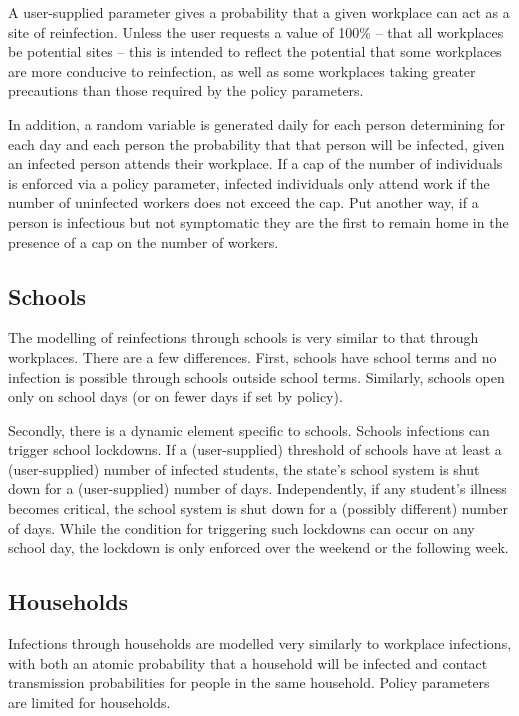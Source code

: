 \documentclass{grattan}
\begin{document}
A user-supplied parameter gives a probability that a given workplace can act as a site
of reinfection. Unless the user requests a value of 100\% -- that all workplaces
be potential sites -- this is intended to reflect the potential that some workplaces are more
conducive to reinfection, as well as some workplaces taking greater precautions than those
required by the policy parameters.

In addition, a random variable is generated daily for each person determining for each day
and each person the probability that that person will be infected, given an infected person
attends their workplace. If a cap of the number of individuals is enforced via a policy
parameter, infected individuals only attend work if the number of uninfected workers does
not exceed the cap. Put another way, if a person is infectious but not symptomatic they are
the first to remain home in the presence of a cap on the number of workers.

\subsection{Schools}

The modelling of reinfections through schools is very similar to that through workplaces.
There are a few differences.
First, schools have school terms and no infection is possible through schools outside school terms.
Similarly, schools open only on school days (or on fewer days if set by policy).

Secondly, there is a dynamic element specific to schools. Schools infections can trigger school
lockdowns. If a (user-supplied) threshold of schools have at least a (user-supplied) number of
infected students, the state's school system is shut down for a (user-supplied) number of days.
Independently, if any student's illness becomes critical, the school system is shut down for
a (possibly different) number of days.  While the condition for triggering such lockdowns can occur
on any school day, the lockdown is only enforced over the weekend or the following week.

\subsection{Households}

Infections through households are modelled very similarly to workplace infections,
with both an atomic probability that a household will be infected and contact
transmission probabilities for people in the same household.
Policy parameters are limited for households.
\end{document}
